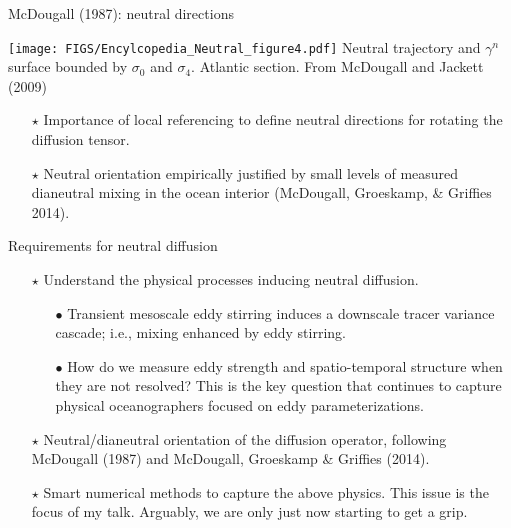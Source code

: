 \documentclass{beamer}
\begin{document}
\begin{frame}{McDougall (1987): neutral directions}

\begin{center}
\texttt{[image: FIGS/Encylcopedia\_Neutral\_figure4.pdf]}
\newline 
{\scriptsize Neutral trajectory and $\gamma^{n}$ surface bounded by $\sigma_{0}$ and $\sigma_{4}$. Atlantic section.  From McDougall and Jackett (2009)}
\end{center}

\begin{itemize}
    \item[$\star$] Importance of local referencing to define  neutral directions for rotating the diffusion tensor.  
    
    \item[$\star$] Neutral orientation empirically justified by small levels of measured dianeutral mixing in the ocean interior (McDougall, Groeskamp, \& Griffies 2014).     
\end{itemize}

\end{frame}


\begin{frame}{Requirements for neutral diffusion}

\begin{itemize}
    \item[$\star$] Understand the physical processes inducing neutral diffusion.
       \begin{itemize}
           \item[$\bullet$] Transient mesoscale eddy stirring induces a downscale tracer variance cascade; i.e., mixing enhanced by eddy stirring. 
            \item[$\bullet$] How do we measure eddy strength and spatio-temporal structure when they are not resolved? This is the key question that continues to capture physical oceanographers focused on eddy parameterizations.
       \end{itemize}
    \item[$\star$] Neutral/dianeutral orientation of the diffusion operator, following McDougall (1987) and McDougall, Groeskamp \& Griffies (2014).   
    
    \item[$\star$] Smart numerical methods to capture the above physics.  This issue is the focus of my talk. Arguably, we are only just now starting to get a grip. 

\end{itemize}

\end{frame}
\end{document}
